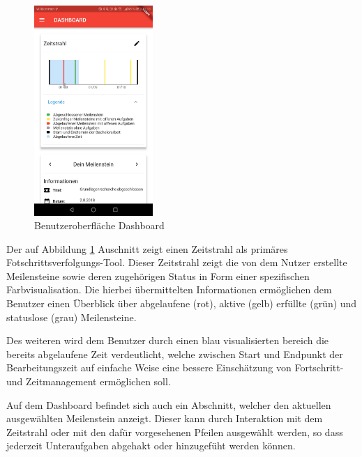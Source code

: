 \documentclass[bibliography=totoc,listof=totoc,BCOR=5mm,DIV=12,oneside]{scrbook}
\begin{document}
\bigskip
\begin{figure}[H]
	\centering
		\includegraphics[width=0.4\textwidth,keepaspectratio]{Bilder/Prototyp/app_screenshots/DashboardScreenshot.jpg}
	\caption{Benutzeroberfläche Dashboard}
	\label{img:dashboard}
\end{figure}

\par Der auf Abbildung \ref{img:dashboard} Auschnitt zeigt einen Zeitstrahl als primäres Fotschrittsverfolgungs-Tool. Dieser Zeitstrahl zeigt die von dem Nutzer erstellte Meilensteine sowie deren zugehörigen Status in Form einer spezifischen Farbvisualisation. Die hierbei übermittelten Informationen ermöglichen dem Benutzer einen Überblick über abgelaufene (rot), aktive (gelb) erfüllte (grün) und statuslose (grau) Meilensteine. 
\par Des weiteren wird dem Benutzer durch einen blau visualisierten bereich die bereits abgelaufene Zeit verdeutlicht, welche zwischen Start und Endpunkt der Bearbeitungszeit auf einfache Weise eine bessere Einschätzung von Fortschritt- und Zeitmanagement ermöglichen soll.

\par \bigskip Auf dem Dashboard befindet sich auch ein Abschnitt, welcher den aktuellen ausgewählten Meilenstein anzeigt. Dieser kann durch Interaktion mit dem Zeitstrahl oder mit den dafür vorgesehenen Pfeilen ausgewählt werden, so dass jederzeit Unteraufgaben abgehakt oder hinzugefüht werden können.
\end{document}
